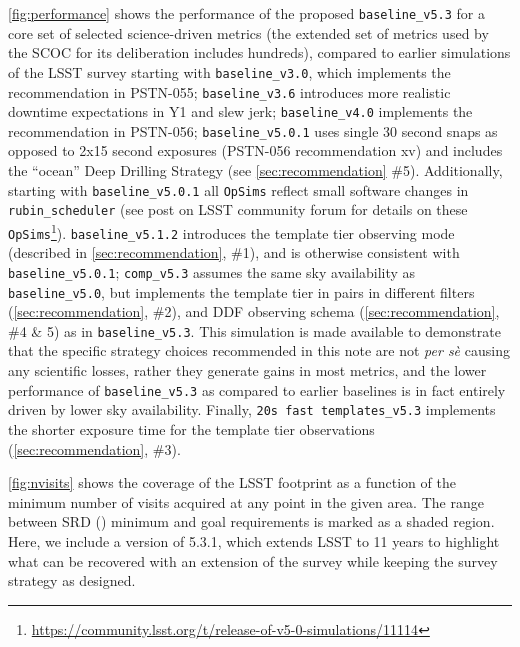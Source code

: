 \documentclass[SE,authoryear,toc]{lsstdoc}
\begin{document}
 \autoref{fig:performance} shows the performance of the proposed \texttt{baseline\_v5.3} for a core set of selected science-driven metrics (the extended set of metrics used by the SCOC for its deliberation includes hundreds), compared to earlier simulations of the LSST survey starting with \texttt{baseline\_v3.0}, which implements the recommendation in PSTN-055; \texttt{baseline\_v3.6} introduces more realistic downtime expectations in Y1 and slew jerk; \texttt{baseline\_v4.0} implements the recommendation in PSTN-056; \texttt{baseline\_v5.0.1} uses single 30 second snaps as opposed to 2x15 second exposures (PSTN-056 recommendation xv) and includes the ``ocean'' Deep Drilling Strategy (see \autoref{sec:recommendation} \#5). Additionally, starting with \texttt{baseline\_v5.0.1} all \texttt{OpSims} reflect small software changes in \texttt{rubin\_scheduler} (see post on LSST community forum for details on these \texttt{OpSims}\footnote{\url{https://community.lsst.org/t/release-of-v5-0-simulations/11114}}).
 \texttt{baseline\_v5.1.2} introduces the template tier observing mode (described in \autoref{sec:recommendation}, \#1), and is otherwise consistent with \texttt{baseline\_v5.0.1}; \texttt{comp\_v5.3} assumes the same sky availability as \texttt{baseline\_v5.0}, but implements the template tier in pairs in different filters (\autoref{sec:recommendation}, \#2), and DDF observing schema (\autoref{sec:recommendation}, \#4 \& 5) as in \texttt{baseline\_v5.3}. This simulation is made available to demonstrate that the specific strategy choices recommended in this note are not \emph{per sè} causing any scientific losses, rather they generate gains in most metrics, and the lower performance of \texttt{baseline\_v5.3} as compared to earlier baselines is in fact entirely driven by lower sky availability. Finally, \texttt{20s fast templates\_v5.3} implements the shorter exposure time for the template tier observations (\autoref{sec:recommendation}, \#3).

\autoref{fig:nvisits} shows the coverage of the LSST footprint as a function of the minimum number of visits acquired at any point in the given area. The range between SRD (\citep{LPM-17}) minimum and goal requirements is marked as a shaded region. Here, we include a version of 5.3.1, which extends LSST to 11 years to highlight what can be recovered with an extension of the survey while keeping the survey strategy as designed.
\end{document}
